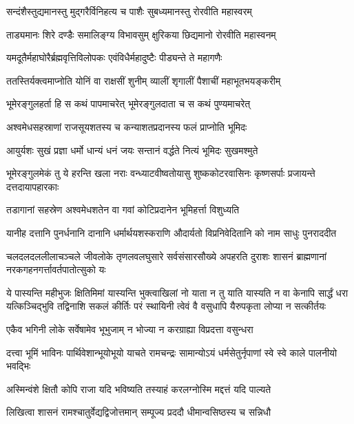 \twolineshloka
{सन्दंशैस्तुद्यमानस्तु मुद्गरैर्विनिहत्य च}
{पाशैः सुबध्यमानस्तु रोरवीति महास्वरम्}%

\twolineshloka
{ताड्यमानः शिरे दण्डैः समालिङ्ग्य विभावसुम्}
{क्षुरिकया छिद्यमानो रोरवीति महास्वनम्}%

\twolineshloka
{यमदूतैर्महाघोरैर्ब्रह्मवृत्तिविलोपकः}
{एवंविधैर्महादुष्टैः पीड्यन्ते ते महागणैः}%

\twolineshloka
{ततस्तिर्यक्त्वमाप्नोति योनिं वा राक्षसीं शुनीम्}
{व्यालीं शृगालीं पैशाचीं महाभूतभयङ्करीम्}%

\twolineshloka
{भूमेरङ्गुलहर्ता हि स कथं पापमाचरेत्}
{भूमेरङ्गुलदाता च स कथं पुण्यमाचरेत्}%

\twolineshloka
{अश्वमेधसहस्राणां राजसूयशतस्य च}
{कन्याशतप्रदानस्य फलं प्राप्नोति भूमिदः}%

\twolineshloka
{आयुर्यशः सुखं प्रज्ञा धर्मो धान्यं धनं जयः}
{सन्तानं वर्द्धते नित्यं भूमिदः सुखमश्मुते}%

\threelineshloka
{भूमेरङ्गुलमेकं तु ये हरन्ति खला नराः}
{वन्ध्याटवीष्वतोयासु शुष्ककोटरवासिनः}
{कृष्णसर्पाः प्रजायन्ते दत्तदायापहारकाः}%

\twolineshloka
{तडागानां सहस्रेण अश्वमेधशतेन वा}
{गवां कोटिप्रदानेन भूमिहर्त्ता विशुध्यति}%

\twolineshloka
{यानीह दत्तानि पुनर्धनानि दानानि धर्मार्थयशस्कराणि}
{औदार्यतो विप्रनिवेदितानि को नाम साधुः पुनराददीत}%

\twolineshloka
{चलदलदललीलाचञ्चले जीवलोके तृणलवलघुसारे सर्वसंसारसौख्ये}
{अपहरति दुराशः शासनं ब्राह्मणानां नरकगहनगर्त्तावर्तपातोत्सुको यः}%

\twolineshloka
{ये पास्यन्ति महीभुजः क्षितिमिमां यास्यन्ति भुक्त्वाखिलां नो याता न तु याति यास्यति न वा केनापि सार्द्धं धरा}
{यत्किञ्चिद्भुवि तद्विनाशि सकलं कीर्तिः परं स्थायिनी त्वेवं वै वसुधापि यैरुपकृता लोप्या न सत्कीर्तयः}%

\twolineshloka
{एकैव भगिनी लोके सर्वेषामेव भूभुजाम्}
{न भोज्या न करग्राह्या विप्रदत्ता वसुन्धरा}%

\twolineshloka
{दत्त्वा भूमिं भाविनः पार्थिवेशान्भूयोभूयो याचते रामचन्द्रः}
{सामान्योऽयं धर्मसेतुर्नृपाणां स्वे स्वे काले पालनीयो भवद्भिः}%

\twolineshloka
{अस्मिन्वंशे क्षितौ कोपि राजा यदि भविष्यति}
{तस्याहं करलग्नोस्मि मद्दत्तं यदि पाल्यते}%

\twolineshloka
{लिखित्वा शासनं रामश्चातुर्वेद्यद्विजोत्तमान्}
{सम्पूज्य प्रददौ धीमान्वसिष्ठस्य च सन्निधौ}%

